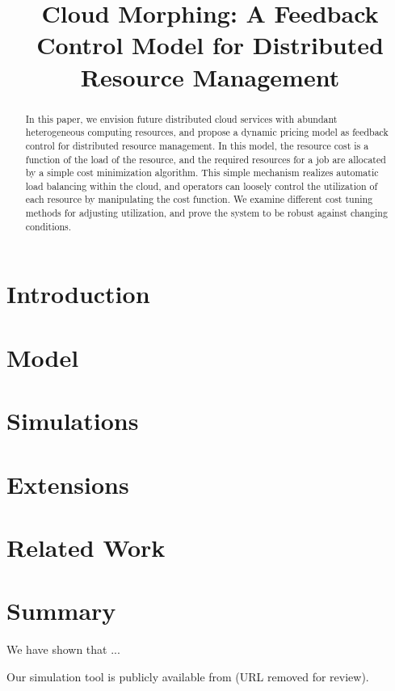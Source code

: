 \documentclass[10pt,sigconf,letterpaper,anonymous,nonacm]{acmart}
\title{Cloud Morphing: A Feedback Control Model for Distributed Resource Management}
\begin{document}
\begin{abstract}

    In this paper, we envision future distributed cloud services with
    abundant heterogeneous computing resources,
    and propose a dynamic pricing model as feedback control for
    distributed resource management.
    In this model, the resource cost is a function of the load of the
    resource, and the required resources for a job are allocated by a
    simple cost minimization algorithm.  This simple mechanism realizes
    automatic load balancing within the cloud, and operators can loosely
    control the utilization of each resource by manipulating the cost function.
    We examine different cost tuning methods for adjusting utilization, and
    prove the system to be robust against changing conditions.

\end{abstract}

\maketitle

\section{Introduction}



\section{Model}



\section{Simulations}



\section{Extensions}



\section{Related Work}



\section{Summary}

We have shown that ...

Our simulation tool is publicly available from (URL removed for review).



\end{document}
